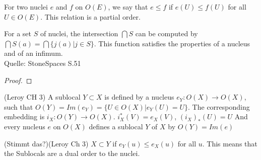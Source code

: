 \begin{definition}
    \label{def:nucleus_partial_order}
    \mathlibok
    \leanok
    For two nuclei $e$ and $f$ on $O(E)$, we say that $e \le f$ if $e(U) \le f(U)$ for all $U \in O(E)$.
    This relation is a partial order.
\end{definition}

\begin{lemma} 
    \label{lem:nucleus_intersection}
    \mathlibok
    \leanok
    For a set $S$ of nuclei, the intersection $\bigcap S$ can be computed by $\bigcap S(a) = \bigcap \{j(a) | j \in S \}$.
    This function satisfies the properties of a nucleus and of an infimum. \\
    Quelle: StoneSpaces S.51
\end{lemma}
\begin{proof}
    \leanok
\end{proof}


\begin{definition}[Sublocal]
(Leroy CH 3)
    \label{def:sublocal}
    \leanok
    A sublocal $Y \subset X$ is defined by a nucleus $e_Y: O(X) \rightarrow O(X)$, such that $O(Y) = Im(e_Y) = \{U \in O(X) | e_Y(U) = U\}$.
    The corresponding embedding is $i_X : O(Y) \rightarrow O(X)$. $i^*_X(V) = e_X(V)$, $(i_X)_*(U) = U$
    And every nucleus $e$ on $O(X)$ defines a sublocal $Y$ of $X$ by $O(Y) = Im(e)$
\end{definition}

\begin{definition}
(Stimmt das?)(Leroy Ch 3)
    \label{def:sublocal_inclusion}
    \leanok
    $X \subset Y$ if $e_Y(u) \le e_X(u)$ for all $u$. This means that the Sublocals are a dual order to the nuclei.
\end{definition}


